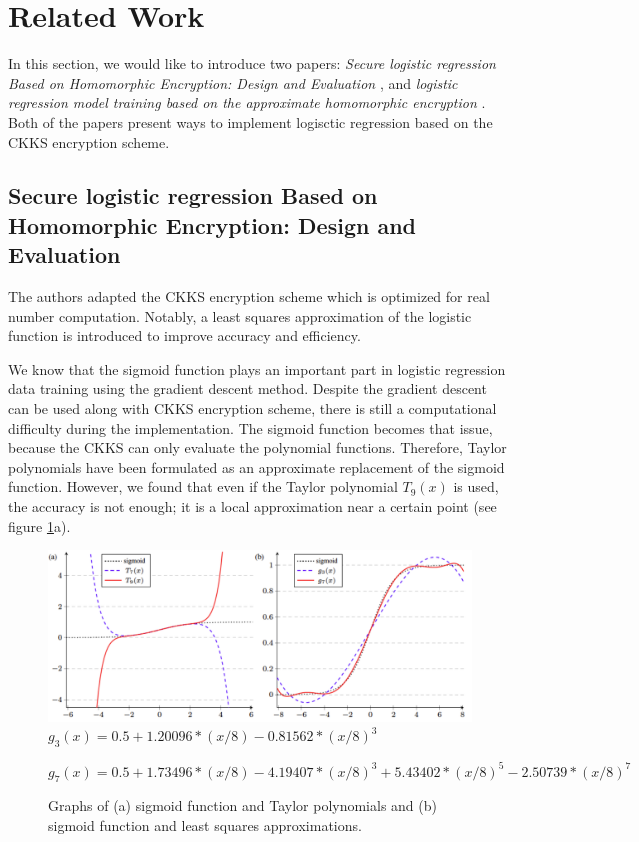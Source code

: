 \section{Related Work}
    \begin{text}
    In this section, we would like to introduce two papers: \textit{Secure logistic regression Based on Homomorphic Encryption: Design and Evaluation} \cite{MiranKim2018}, and \textit{logistic regression model training based on the approximate homomorphic encryption} \cite{Kim2018}. Both of the papers present ways to implement logisctic regression based on the CKKS encryption scheme.
    \end{text}
    
    \subsection{Secure logistic regression Based on Homomorphic Encryption: Design and Evaluation}
    The authors adapted the CKKS encryption scheme which is optimized for real number computation. Notably, a least squares approximation of the logistic function is introduced to improve accuracy and efficiency.
    
    We know that the sigmoid function plays an important part in logistic regression data training using the gradient descent method. Despite the gradient descent can be used along with CKKS encryption scheme, there is still a computational difficulty during the implementation. The sigmoid function becomes that issue, because the CKKS can only evaluate the polynomial functions. Therefore, Taylor polynomials have been formulated as an approximate replacement of the sigmoid function. However, we found that even if the Taylor polynomial $T_9(x)$ is used, the accuracy is not enough; it is a local approximation near a certain point (see figure \ref{fig:approxsigmoid}a). 
    
    \begin{figure}[ht]
        \centering
        \includegraphics[width=1\linewidth]{images/Screenshot from 2021-10-03 23-12-29.png}
        $g_3(x)=0.5 + 1.20096 * (x/8) - 0.81562 * (x/8)^3$
        
        $g_7(x)=0.5 + 1.73496 * (x/8) - 4.19407 * (x/8)^3 + 5.43402 * (x/8)^5 - 2.50739 * (x/8)^7$
        \caption{Graphs of (a) sigmoid function and Taylor polynomials and (b) sigmoid function and least squares approximations. \cite{MiranKim2018}}
        \label{fig:approxsigmoid}
    \end{figure} 
    
